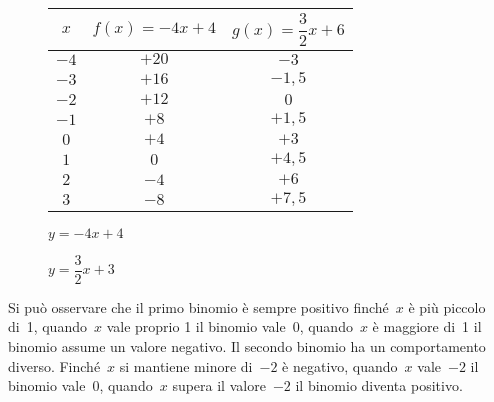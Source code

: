 \begin{inaccessibleblock}
 \begin{figure}[h]
 \begin{minipage}[]{.45\textwidth}
\begin{center}
 \begin{tabular}{c|c|c}
  \(x\) & \(f(x) = -4 x +4\) & \(g(x) = \dfrac{3}{2} x +6\) \\
  \hline
  \(-4\) & \(+20\) & \(-3\) \\
  \(-3\) & \(+16\) & \(-1,5\) \\
  \(-2\) & \(+12\) & \(0\) \\
  \(-1\) & \(+8\) & \(+1,5\) \\
  \( 0\) & \(+4\) & \(+3\) \\
  \( 1\) & \(0\) & \(+4,5\) \\
  \( 2\) & \(-4\) & \(+6\) \\
  \( 3\) & \(-8\) & \(+7,5\) %
 \end{tabular}
\end{center}
 \end{minipage}
 \hfill
 \begin{minipage}[]{.25\textwidth}
\begin{center} 
\rettaa 
\vspace{3mm}
\(y = -4 x +4\)
\end{center}
 \end{minipage}
 \hfill
 \begin{minipage}[]{.25\textwidth}
\begin{center} 
\rettab 
\(y = \dfrac{3}{2} x +3\)
\end{center}
 \end{minipage}
\end{figure}
\end{inaccessibleblock}

Si può osservare che il primo binomio è sempre positivo finché~\(x\) è più 
piccolo di~1, quando~\(x\) vale proprio 1 il binomio vale~0, quando~\(x\) è 
maggiore di~1 il binomio assume un valore negativo.
Il secondo binomio ha un comportamento diverso. Finché~\(x\) si mantiene 
minore di~\(-2\) è negativo, quando~\(x\) vale~\(-2\) il binomio vale~0, 
quando~\(x\) supera il valore~\(-2\) il binomio diventa positivo.

